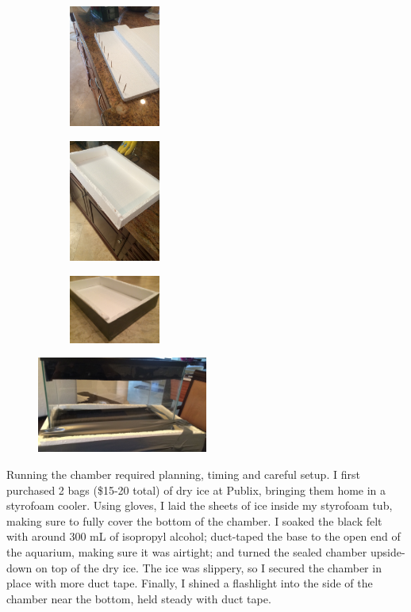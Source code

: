 \documentclass[notitlepage]{article}
\begin{document}
\begin{figure}[h!]
\centering
\begin{subfigure}{.3\textwidth}
  \centering
  \includegraphics[width=3cm,angle=270]{base_construction}
  \label{fig:sub1}
\end{subfigure}
\begin{subfigure}{.3\textwidth}
  \centering
  \includegraphics[width=3cm,angle=270]{base_construction_2}
  \label{fig:sub2}
\end{subfigure}
\begin{subfigure}{.3\textwidth}
  \centering
  \includegraphics[width=3cm]{base}
  \label{fig:sub2}
\end{subfigure}
\label{fig:test}
\end{figure}

\begin{figure}
\centering
\includegraphics[width=0.5\textwidth]{assembled}
\end{figure}

Running the chamber required planning, timing and careful setup. I first purchased 2 bags (\$15-20 total) of dry ice at Publix, bringing them home in a styrofoam cooler. Using gloves, I laid the sheets of ice inside my styrofoam tub, making sure to fully cover the bottom of the chamber. I soaked the black felt with around 300 mL of isopropyl alcohol; duct-taped the base to the open end of the aquarium, making sure it was airtight; and turned the sealed chamber upside-down on top of the dry ice. The ice was slippery, so I secured the chamber in place with more duct tape. Finally, I shined a flashlight into the side of the chamber near the bottom, held steady with duct tape.
\end{document}
